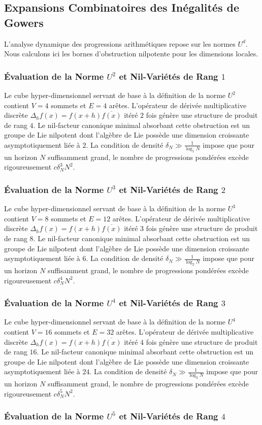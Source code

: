 \documentclass[11pt,a4paper]{article}
\begin{document}
\subsection{Expansions Combinatoires des Inégalités de Gowers}
L'analyse dynamique des progressions arithmétiques repose sur les normes $U^d$. Nous calculons ici les bornes d'obstruction nilpotente pour les dimensions locales.
\subsubsection{Évaluation de la Norme $U^{2}$ et Nil-Variétés de Rang $1$}
Le cube hyper-dimensionnel servant de base à la définition de la norme $U^{2}$ contient $V = 4$ sommets et $E = 4$ arêtes. L'opérateur de dérivée multiplicative discrète $\Delta_h f(x) = f(x+h)\overline{f(x)}$ itéré $2$ fois génère une structure de produit de rang $4$. Le nil-facteur canonique minimal absorbant cette obstruction est un groupe de Lie nilpotent dont l'algèbre de Lie possède une dimension croissante asymptotiquement liée à $2$. La condition de densité $\delta_N \gg \frac{1}{\log_{1} N}$ impose que pour un horizon $N$ suffisamment grand, le nombre de progressions pondérées excède rigoureusement $c \delta_N^{3} N^2$. \subsubsection{Évaluation de la Norme $U^{3}$ et Nil-Variétés de Rang $2$}
Le cube hyper-dimensionnel servant de base à la définition de la norme $U^{3}$ contient $V = 8$ sommets et $E = 12$ arêtes. L'opérateur de dérivée multiplicative discrète $\Delta_h f(x) = f(x+h)\overline{f(x)}$ itéré $3$ fois génère une structure de produit de rang $8$. Le nil-facteur canonique minimal absorbant cette obstruction est un groupe de Lie nilpotent dont l'algèbre de Lie possède une dimension croissante asymptotiquement liée à $6$. La condition de densité $\delta_N \gg \frac{1}{\log_{2} N}$ impose que pour un horizon $N$ suffisamment grand, le nombre de progressions pondérées excède rigoureusement $c \delta_N^{4} N^2$. \subsubsection{Évaluation de la Norme $U^{4}$ et Nil-Variétés de Rang $3$}
Le cube hyper-dimensionnel servant de base à la définition de la norme $U^{4}$ contient $V = 16$ sommets et $E = 32$ arêtes. L'opérateur de dérivée multiplicative discrète $\Delta_h f(x) = f(x+h)\overline{f(x)}$ itéré $4$ fois génère une structure de produit de rang $16$. Le nil-facteur canonique minimal absorbant cette obstruction est un groupe de Lie nilpotent dont l'algèbre de Lie possède une dimension croissante asymptotiquement liée à $24$. La condition de densité $\delta_N \gg \frac{1}{\log_{3} N}$ impose que pour un horizon $N$ suffisamment grand, le nombre de progressions pondérées excède rigoureusement $c \delta_N^{5} N^2$. \subsubsection{Évaluation de la Norme $U^{5}$ et Nil-Variétés de Rang $4$}
\end{document}
